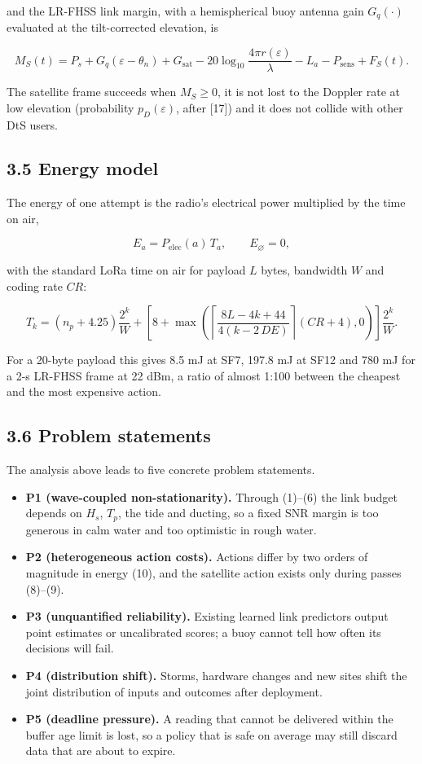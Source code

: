 \documentclass[
  11pt,
]{article}
\providecommand{\tightlist}{%
  \setlength{\itemsep}{0pt}\setlength{\parskip}{0pt}}
\begin{document}
and the LR-FHSS link margin, with a hemispherical buoy antenna gain
\(G_q(\cdot)\) evaluated at the tilt-corrected elevation, is

\[M_S(t)=P_s+G_q(\varepsilon-\theta_n)+G_{\mathrm{sat}}-20\log_{10}\frac{4\pi r(\varepsilon)}{\lambda}-L_a-P_{\mathrm{sens}}+F_S(t). \tag{9}\]

The satellite frame succeeds when \(M_S\ge 0\), it is not lost to the
Doppler rate at low elevation (probability \(p_D(\varepsilon)\), after
{[}17{]}) and it does not collide with other DtS users.

\hypertarget{energy-model}{%
\subsection{3.5 Energy model}\label{energy-model}}

The energy of one attempt is the radio's electrical power multiplied by
the time on air,

\[E_a=P_{\mathrm{elec}}(a)\,T_a,\qquad E_\varnothing=0, \tag{10}\]

with the standard LoRa time on air for payload \(L\) bytes, bandwidth
\(W\) and coding rate \(CR\):

\[T_k=\left(n_p+4.25\right)\frac{2^k}{W}+\left[8+\max\!\left(\left\lceil\frac{8L-4k+44}{4(k-2\,DE)}\right\rceil(CR+4),0\right)\right]\frac{2^k}{W}. \tag{11}\]

For a 20-byte payload this gives 8.5 mJ at SF7, 197.8 mJ at SF12 and 780
mJ for a 2-s LR-FHSS frame at 22 dBm, a ratio of almost 1:100 between
the cheapest and the most expensive action.

\hypertarget{problem-statements}{%
\subsection{3.6 Problem statements}\label{problem-statements}}

The analysis above leads to five concrete problem statements.

\begin{itemize}
\tightlist
\item
  \textbf{P1 (wave-coupled non-stationarity).} Through (1)--(6) the link
  budget depends on \(H_s\), \(T_p\), the tide and ducting, so a fixed
  SNR margin is too generous in calm water and too optimistic in rough
  water.
\item
  \textbf{P2 (heterogeneous action costs).} Actions differ by two orders
  of magnitude in energy (10), and the satellite action exists only
  during passes (8)--(9).
\item
  \textbf{P3 (unquantified reliability).} Existing learned link
  predictors output point estimates or uncalibrated scores; a buoy
  cannot tell how often its decisions will fail.
\item
  \textbf{P4 (distribution shift).} Storms, hardware changes and new
  sites shift the joint distribution of inputs and outcomes after
  deployment.
\item
  \textbf{P5 (deadline pressure).} A reading that cannot be delivered
  within the buffer age limit is lost, so a policy that is safe on
  average may still discard data that are about to expire.
\end{itemize}
\end{document}
